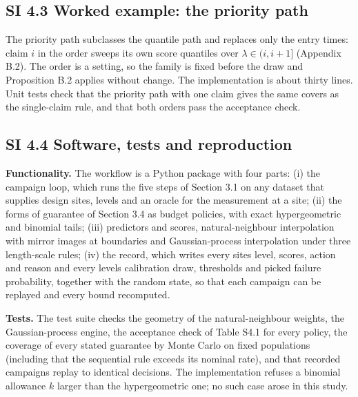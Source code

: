 \documentclass{iopjournal}
\begin{document}
\hypertarget{si-4.3-worked-example-the-priority-path}{%
\subsection*{SI 4.3 Worked example: the priority path}\label{si-4.3-worked-example-the-priority-path}}

The priority path subclasses the quantile path and replaces only the entry times: claim \(i\) in the order sweeps its own score quantiles over \(\lambda \in (i, i + 1]\) (Appendix B.2). The order is a setting, so the family is fixed before the draw and Proposition B.2 applies without change. The implementation is about thirty lines. Unit tests check that the priority path with one claim gives the same covers as the single-claim rule, and that both orders pass the acceptance check.

\hypertarget{si-4.4-software-tests-and-reproduction}{%
\subsection*{SI 4.4 Software, tests and reproduction}\label{si-4.4-software-tests-and-reproduction}}

\textbf{Functionality.} The workflow is a Python package with four parts: (i) the campaign loop, which runs the five steps of Section 3.1 on any dataset that supplies design sites, levels and an oracle for the measurement at a site; (ii) the forms of guarantee of Section 3.4 as budget policies, with exact hypergeometric and binomial tails; (iii) predictors and scores, natural-neighbour interpolation with mirror images at boundaries and Gaussian-process interpolation under three length-scale rules; (iv) the record, which writes every site\textquotesingle s level, scores, action and reason and every level\textquotesingle s calibration draw, thresholds and picked failure probability, together with the random state, so that each campaign can be replayed and every bound recomputed.

\textbf{Tests.} The test suite checks the geometry of the natural-neighbour weights, the Gaussian-process engine, the acceptance check of Table S4.1 for every policy, the coverage of every stated guarantee by Monte Carlo on fixed populations (including that the sequential rule exceeds its nominal rate), and that recorded campaigns replay to identical decisions. The implementation refuses a binomial allowance \(k\) larger than the hypergeometric one; no such case arose in this study.
\end{document}
